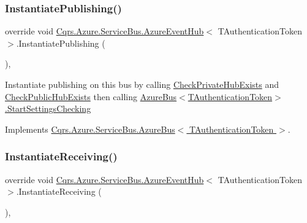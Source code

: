 \subsubsection{\texorpdfstring{Instantiate\+Publishing()}{InstantiatePublishing()}}
{\footnotesize\ttfamily override void \hyperlink{classCqrs_1_1Azure_1_1ServiceBus_1_1AzureEventHub}{Cqrs.\+Azure.\+Service\+Bus.\+Azure\+Event\+Hub}$<$ T\+Authentication\+Token $>$.Instantiate\+Publishing (\begin{DoxyParamCaption}{ }\end{DoxyParamCaption})\hspace{0.3cm}{\ttfamily [protected]}, {\ttfamily [virtual]}}



Instantiate publishing on this bus by calling \hyperlink{classCqrs_1_1Azure_1_1ServiceBus_1_1AzureEventHub_a5eea5010c95290cb4081679538a06555_a5eea5010c95290cb4081679538a06555}{Check\+Private\+Hub\+Exists} and \hyperlink{classCqrs_1_1Azure_1_1ServiceBus_1_1AzureEventHub_ae60a7cddcb566ff8f5cf2ac2db17733e_ae60a7cddcb566ff8f5cf2ac2db17733e}{Check\+Public\+Hub\+Exists} then calling \hyperlink{classCqrs_1_1Azure_1_1ServiceBus_1_1AzureBus_acb7f47329c17646805545e78d0776efe_acb7f47329c17646805545e78d0776efe}{Azure\+Bus$<$\+T\+Authentication\+Token$>$.\+Start\+Settings\+Checking} 



Implements \hyperlink{classCqrs_1_1Azure_1_1ServiceBus_1_1AzureBus_a0bacaa4619921333da4a27371c1d6d0a_a0bacaa4619921333da4a27371c1d6d0a}{Cqrs.\+Azure.\+Service\+Bus.\+Azure\+Bus$<$ T\+Authentication\+Token $>$}.

\mbox{\label{classCqrs_1_1Azure_1_1ServiceBus_1_1AzureEventHub_aa725781eddb65bdfe456a4fecb36fb6b_aa725781eddb65bdfe456a4fecb36fb6b}} 
\subsubsection{\texorpdfstring{Instantiate\+Receiving()}{InstantiateReceiving()}}
{\footnotesize\ttfamily override void \hyperlink{classCqrs_1_1Azure_1_1ServiceBus_1_1AzureEventHub}{Cqrs.\+Azure.\+Service\+Bus.\+Azure\+Event\+Hub}$<$ T\+Authentication\+Token $>$.Instantiate\+Receiving (\begin{DoxyParamCaption}{ }\end{DoxyParamCaption})\hspace{0.3cm}{\ttfamily [protected]}, {\ttfamily [virtual]}}



